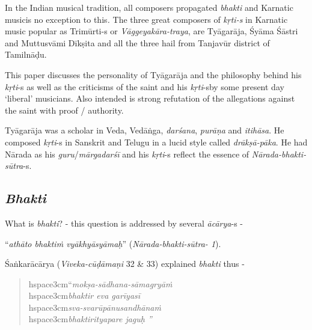 In the Indian musical tradition, all composers propagated \textit{bhakti} and Karnatic musicis no exception to this\textit{. }The three great composers of \textit{kṛti-s} in Karnatic music popular as Trimūrti-s or \textit{Vāggeyakāra-traya}, are Tyāgarāja, Śyāma Śāstri and Muttusvāmi Dīkṣita and all the three hail from Tanjavūr district of Tamilnāḍu. 

This paper discusses the personality of Tyāgarāja and the philosophy behind his \textit{kṛti}-s as well as the criticisms of the saint and his \textit{kṛti}-s\break by some present day ‘liberal’ musicians. Also intended is strong refutation of the allegations against the saint with proof / authority.

Tyāgarāja was a scholar in Veda, Vedāṅga, \textit{darśana}, \textit{purāṇa} and \textit{itihāsa}. He composed \textit{kṛti}-s in Sanskrit and Telugu in a lucid style called \textit{drākṣā-pāka}. He had Nārada as his \textit{guru}/\textit{mārgadarśī} and his \textit{kṛti}-s reflect the essence of \textit{Nārada-bhakti-sūtra}-s.

\subsection*{\textit{Bhakti}}

What is \textit{bhakti}? - this question is addressed by several \textit{ācārya}-s - 

“\textit{athāto bhaktiṁ vyākhyāsyāmaḥ}” (\textit{Nārada-bhakti-sūtra- 1}).

Śaṅkarācārya (\textit{Viveka-cūḍāmaṇi} 32 \& 33) explained \textit{bhakti} thus -

\begin{verse}
hspace{3cm}“\textit{mokṣa-sādhana-sāmagryāṁ}\\hspace{3cm}\textit{bhaktir eva garīyasī }\\hspace{3cm}\textit{sva-svarūpānusandhānaṁ}\\hspace{3cm}\textit{bhaktirityapare jaguḥ ”}
\end{verse}

\newpage

